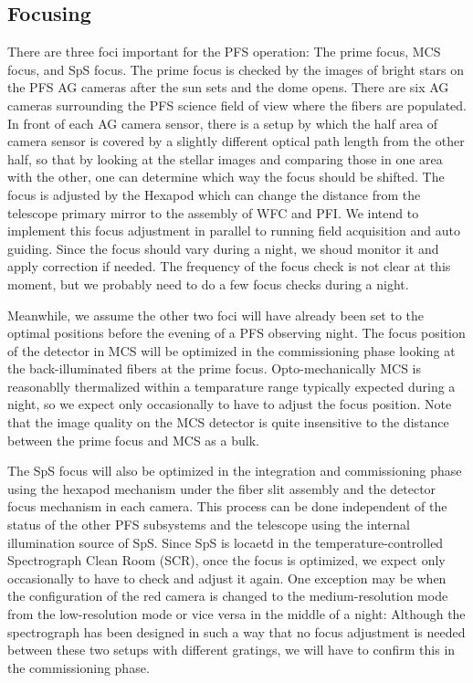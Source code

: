 \documentclass[a4paper]{article}
\begin{document}
\subsection{Focusing}
There are three foci important for the PFS operation: The prime focus,
MCS focus, and SpS focus. The prime focus is checked by the images of
bright stars on the PFS AG cameras after the sun sets and the dome
opens. There are six AG cameras surrounding the PFS science field of
view where the fibers are populated. In front of each AG camera
sensor, there is a setup by which the half area of camera sensor is
covered by a slightly different optical path length from the other
half, so that by looking at the stellar images and comparing those in
one area with the other, one can determine which way the focus should
be shifted. The focus is adjusted by the Hexapod which can change the
distance from the telescope primary mirror to the assembly of WFC and
PFI. We intend to implement this focus adjustment in parallel to
running field acquisition and auto guiding. Since the focus should
vary during a night, we shoud monitor it and apply correction if
needed. The frequency of the focus check is not clear at this moment,
but we probably need to do a few focus checks during a night. 

Meanwhile, we assume the other two foci will have already been set to
the optimal positions before the evening of a PFS observing night. The
focus position of the detector in MCS will be optimized in the
commissioning phase looking at the back-illuminated fibers at the
prime focus. Opto-mechanically MCS is reasonablly thermalized within a
temparature range typically expected during a night, so we expect only
occasionally to have to adjust the focus position. Note that the image
quality on the MCS detector is quite insensitive to the distance
between the prime focus and MCS as a bulk.

The SpS focus will also be optimized in the integration and
commissioning phase using the hexapod mechanism under the fiber slit
assembly and the detector focus mechanism in each camera. This process
can be done independent of the status of the other PFS subsystems and
the telescope using the internal illumination source of SpS. Since SpS
is locaetd in the temperature-controlled Spectrograph Clean Room
(SCR), once the focus is optimized, we expect only occasionally to
have to check and adjust it again. One exception may be when the
configuration of the red camera is changed to the medium-resolution
mode from the low-resolution mode or vice versa in the middle of a
night: Although the spectrograph has been designed in such a way that
no focus adjustment is needed between these two setups with different
gratings, we will have to confirm this in the commissioning phase.
\end{document}

